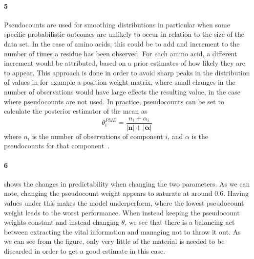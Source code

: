 \documentclass[11pt]{article}\usepackage[]{graphicx}\usepackage[]{color}
\theoremstyle{plain}
\begin{document}
\begin{multicols*}{2}
	\paragraph{5}
	Pseudocounts are used for smoothing distributions in particular when some specific probabilistic outcomes are unlikely to occur in relation to the size of the data set. In the case of amino acids, this could be to add and increment to the number of times a residue has been observed. For each amino acid, a different increment would be attributed, based on a prior estimates of how likely they are to appear. This approach is done in order to avoid sharp peaks in the distribution of values in for example a position weight matrix, where small changes in the number of observations would have large effects the resulting value, in the case where pseudocounts are not used. In practice, pseudocounts can be set to calculate the posterior estimator of the mean as
	\begin{equation*}
		\theta^{PME}_i = \dfrac{n_i + \alpha_i}{|\mathbf n| + |\mathbf \alpha |}
	\end{equation*}
	where $n_i$ is the number of observations of component $i$, and $\alpha$ is the pseudocounts for that component~\cite{durbin1998biological}.
	
	
	\paragraph{6}
	 shows the changes in predictability when changing the two parameters. As we can note, changing the pseudocount weight appears to saturate at around $0.6$. Having values under this makes the model underperform, where the lowest pseudocount weight leads to the worst performance. When instead keeping the pseudocount weights constant and instead changing $\theta$, we see that there is a balancing act between extracting the vital information and managing not to throw it out. As we can see from the figure, only very little of the material is needed to be discarded in order to get a good estimate in this case.
\begin{Schunk}
\begin{figure}[H]


\end{figure}
\end{Schunk}
\end{multicols*}
\end{document}
